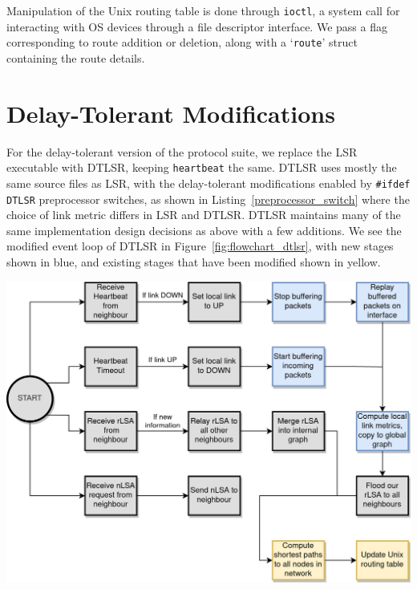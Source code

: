 \documentclass[withindex,glossary,openany]{cam-thesis}
\begin{document}
Manipulation of the Unix routing table is done through \texttt{ioctl}, a system call for interacting with OS devices through a file descriptor interface. We pass a flag corresponding to route addition or deletion, along with a `\texttt{route}' struct containing the route details.

\section{Delay-Tolerant Modifications}
\label{sec:dtlsr_design}

For the delay-tolerant version of the protocol suite, we replace the LSR executable with DTLSR, keeping \texttt{heartbeat} the same. DTLSR uses mostly the same source files as LSR, with the delay-tolerant modifications enabled by \texttt{\#ifdef DTLSR} preprocessor switches, as shown in Listing~\ref{preprocessor_switch} where the choice of link metric differs in LSR and DTLSR. DTLSR maintains many of the same implementation design decisions as above with a few additions. We see the modified event loop of DTLSR in Figure~\ref{fig:flowchart_dtlsr}, with new stages shown in blue, and existing stages that have been modified shown in yellow.

\begin{center}
\begin{minipage}{0.9\textwidth} \centering
	\includegraphics[width=1\textwidth]{flowchart_dtlsr}
	\label{fig:flowchart_dtlsr}
\end{minipage}
\end{center}
\end{document}
